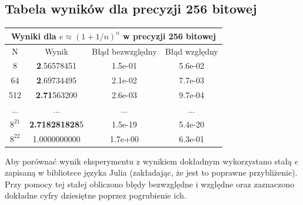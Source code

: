 \documentclass{article}
\begin{document}
\subsection{Tabela wyników dla precyzji 256 bitowej}
\begin{center}
\begin{tabular}{||c||c|c|c||} \hline
\multicolumn{4}{||c||}{Wyniki dla $e \approx (1+1/n)^n$ w precyzji 256 bitowej} \\ \hline
N & Wynik & Błąd bezwzględny & Błąd względny\\ \hline
8 & \textbf{2}.56578451 & 1.5e-01 & 5.6e-02 \\
\hline
64 &  \textbf{2}.69734495 & 2.1e-02 & 7.7e-03\\
\hline
512 &  \textbf{2.71}563200 &  2.6e-03 & 9.7e-04 \\
\hline
... & ...  & ...  & ... \\
\hline
$8^{21}$ & \textbf{2.718281828}5  & 1.5e-19  & 5.4e-20 \\
\hline
$8^{22}$ & 1.0000000000  & 1.7e+00  & 6.3e-01 \\
\hline
\end{tabular}
\end{center}
Aby porównać wynik eksperymentu z wynikiem dokładnym wykorzystano stałą $e$ zapisaną w bibliotece języka Julia (zakładając, że jest to poprawne przybliżenie). Przy pomocy tej stałej obliczono błędy bezwzględne i względne oraz zaznaczono dokładne cyfry dziesiętne poprzez pogrubienie ich.
\newpage
\end{document}
